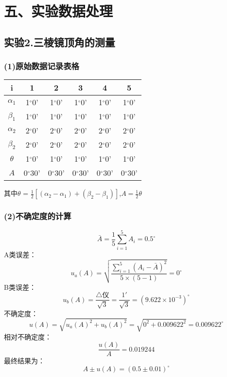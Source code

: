 \documentclass[11pt,a4paper,oneside]{article}
\begin{document}
\section*{五、实验数据处理}
\subsection*{实验2.三棱镜顶角的测量}
\subsubsection*{(1)原始数据记录表格}

\begin{center}

\begin{tabular}{|c|c|c|c|c|c|}
\hline
i & 1 & 2 & 3 & 4 & 5 \\
\hline
${\alpha}_1$
&1$^{\circ}$0'&1$^{\circ}$0'&1$^{\circ}$0'&1$^{\circ}$0'&1$^{\circ}$0'
\\
\hline
${\beta}_1$
&1$^{\circ}$0'&1$^{\circ}$0'&1$^{\circ}$0'&1$^{\circ}$0'&1$^{\circ}$0'
\\
\hline
${\alpha}_2$
&2$^{\circ}$0'&2$^{\circ}$0'&2$^{\circ}$0'&2$^{\circ}$0'&2$^{\circ}$0'
\\
\hline
${\beta}_2$
&2$^{\circ}$0'&2$^{\circ}$0'&2$^{\circ}$0'&2$^{\circ}$0'&2$^{\circ}$0'
\\
\hline
${\theta}$
&1$^{\circ}$0'&1$^{\circ}$0'&1$^{\circ}$0'&1$^{\circ}$0'&1$^{\circ}$0'
\\
\hline
$A$
&0$^{\circ}$30'&0$^{\circ}$30'&0$^{\circ}$30'&0$^{\circ}$30'&0$^{\circ}$30'
\\
\hline
\end{tabular}
\vspace{10pt}

其中$\theta$ = $\displaystyle\frac{1}{2}[({\alpha}_2-{\alpha_1})+({\beta}_2-{\beta}_1)]$,$A=\displaystyle\frac{1}{2}{\theta}$

\end{center}

\subsubsection*{(2)不确定度的计算}

$$\bar{A} =\frac{1}{5}\sum\limits_{i=1}^{5}{A_i}=0.5 ^{\circ} $$
A类误差：$$u_a({A})=\sqrt{\displaystyle\frac{\sum\limits_{i=1}^{5} ({A}_i-\bar{A})^2}{5{\times}(5-1)}}=0 ^{\circ}$$
B类误差：$$u_b({A})=\displaystyle\frac{\bigtriangleup\text{仪}}{\sqrt{3}}
= \frac{1'}{\sqrt{3}} = (9.622 \times 10^{-3})^{\circ} $$
不确定度：$$u({A})=\sqrt{{u_a({A})}^2+{u_b({A})}^2}=\sqrt{ 0^2 + 0.009622^2} = 0.009622 ^{\circ}$$
相对不确定度：$$\displaystyle\frac{u(A)}{A}=0.019244$$
最终结果为：$$A{\pm}u(A) = (0.5 {\pm} 0.01) ^{\circ}$$
\end{document}
